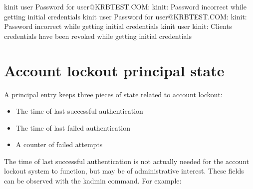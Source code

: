 \documentclass[letterpaper,10pt,english]{sphinxmanual}
\begin{document}
\begin{sphinxVerbatim}[commandchars=\\\{\}]
\PYGZdl{} kinit user
Password for user@KRBTEST.COM:
kinit: Password incorrect while getting initial credentials
\PYGZdl{} kinit user
Password for user@KRBTEST.COM:
kinit: Password incorrect while getting initial credentials
\PYGZdl{} kinit user
kinit: Client\PYGZsq{}s credentials have been revoked while getting initial credentials
\end{sphinxVerbatim}


\section{Account lockout principal state}
\label{\detokenize{admin/lockout:account-lockout-principal-state}}
\sphinxAtStartPar
A principal entry keeps three pieces of state related to account
lockout:
\begin{itemize}
\item {} 
\sphinxAtStartPar
The time of last successful authentication

\item {} 
\sphinxAtStartPar
The time of last failed authentication

\item {} 
\sphinxAtStartPar
A counter of failed attempts

\end{itemize}

\sphinxAtStartPar
The time of last successful authentication is not actually needed for
the account lockout system to function, but may be of administrative
interest.  These fields can be observed with the  kadmin
command.  For example:

\begin{sphinxVerbatim}[commandchars=\\\{\}]
  
 
   \PYG{p}{[}\PYG{p}{]}
        
   
\end{sphinxVerbatim}
\end{document}
